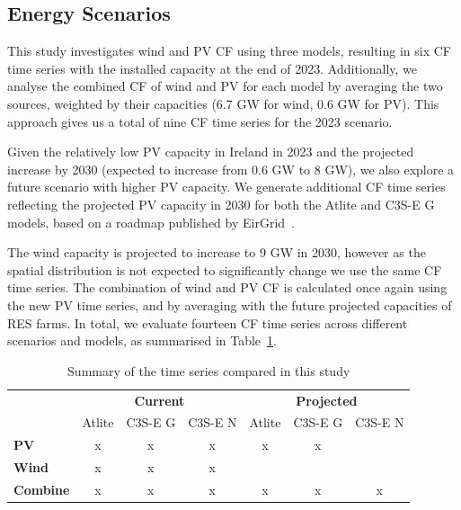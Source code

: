 \documentclass[a4paper, 11pt]{article}
\begin{document}
\subsection{Energy Scenarios}
\label{sec:scenarios}

This study investigates wind and PV CF using three models, resulting in six CF time series with the installed capacity at the end of 2023. Additionally, we analyse the combined CF of wind and PV for each model by averaging the two sources, weighted by their capacities (6.7 GW for wind, 0.6 GW for PV). This approach gives us a total of nine CF time series for the 2023 scenario. 

Given the relatively low PV capacity in Ireland in 2023 and the projected increase by 2030 (expected to increase from 0.6 GW to 8 GW), we also explore a future scenario with higher PV capacity. We generate additional CF time series reflecting the projected PV capacity in 2030 for both the Atlite and C3S-E G models, based on a roadmap published by EirGrid~\cite{eirgrid2023future}.

The wind capacity is projected to increase to 9 GW in 2030, however as the spatial distribution is not expected to significantly change we use the same CF time series. The combination of wind and PV CF is calculated once again using the new PV time series, and by averaging with the future projected capacities of RES farms. In total, we evaluate fourteen CF time series across different scenarios and models, as summarised in Table~\ref{tab:datasets}.

\begin{table}[h!]
	\centering
	\begin{tabular}{l|ccc|ccc|}
		\cline{2-7}
		& \multicolumn{3}{c|}{\textbf{Current}}                                   & \multicolumn{3}{c|}{\textbf{Projected}}                                   \\ \cline{2-7} 
	    & \multicolumn{1}{c|}{Atlite} & \multicolumn{1}{c|}{C3S-E G} & C3S-E N & \multicolumn{1}{c|}{Atlite} & \multicolumn{1}{c|}{C3S-E G} & C3S-E N \\ \hline
		\multicolumn{1}{|l|}{\textbf{PV}}      & \multicolumn{1}{c|}{x}      & \multicolumn{1}{c|}{x}       & x       & \multicolumn{1}{c|}{x}      & \multicolumn{1}{c|}{x}       &         \\
		\multicolumn{1}{|l|}{\textbf{Wind}}    & \multicolumn{1}{c|}{x}      & \multicolumn{1}{c|}{x}       & x       & \multicolumn{1}{c|}{}       & \multicolumn{1}{c|}{}        &         \\
		\multicolumn{1}{|l|}{\textbf{Combine}} & \multicolumn{1}{c|}{x}      & \multicolumn{1}{c|}{x}       & x       & \multicolumn{1}{c|}{x}      & \multicolumn{1}{c|}{x}       & x       \\ \hline
	\end{tabular}
	\caption{Summary of the time series compared in this study}
	\label{tab:datasets}
\end{table}
\end{document}
